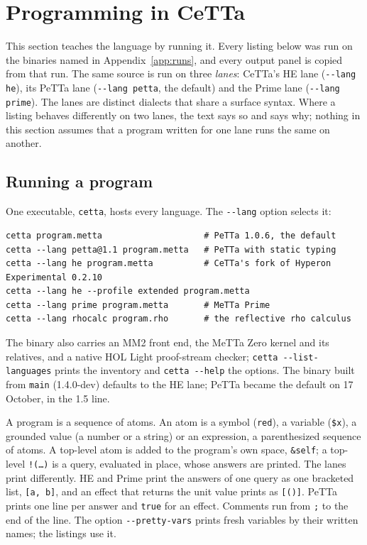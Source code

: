 \documentclass[11pt]{article}
\newcommand{\code}[1]{\texttt{#1}}
\newcommand{\PeTTa}{\textup{PeTTa}}
\newcommand{\HE}{\textup{HE}}
\newcommand{\CeTTa}{\textup{CeTTa}}
\begin{document}
\section{Programming in \CeTTa{}}
\label{sec:tutorial}

This section teaches the language by running it.  Every listing below was run
on the binaries named in Appendix~\ref{app:runs}, and every output panel is
copied from that run.  The same source is run on three \emph{lanes}: \CeTTa{}'s
\HE{} lane (\code{-{}-lang he}), its \PeTTa{} lane (\code{-{}-lang petta}, the
default) and the Prime lane (\code{-{}-lang prime}).  The lanes are distinct
dialects that share a surface syntax.  Where a listing behaves differently on
two lanes, the text says so and says why; nothing in this section assumes that
a program written for one lane runs the same on another.

\subsection{Running a program}
\label{sec:tut-running}

One executable, \code{cetta}, hosts every language.  The \code{-{}-lang} option
selects it:

\begin{lstlisting}[style=metta]
cetta program.metta                    # PeTTa 1.0.6, the default
cetta --lang petta@1.1 program.metta   # PeTTa with static typing
cetta --lang he program.metta          # CeTTa's fork of Hyperon Experimental 0.2.10
cetta --lang he --profile extended program.metta
cetta --lang prime program.metta       # MeTTa Prime
cetta --lang rhocalc program.rho       # the reflective rho calculus
\end{lstlisting}

\noindent
The binary also carries an MM2 front end, the MeTTa Zero kernel and its
relatives, and a native HOL Light proof-stream checker; \code{cetta
-{}-list-languages} prints the inventory and \code{cetta -{}-help} the options.
The binary built from \code{main} (1.4.0-dev) defaults to the \HE{} lane;
\PeTTa{} became the default on 17 October, in the 1.5 line.

A program is a sequence of atoms.  An atom is a symbol (\code{red}), a
variable (\code{\$x}), a grounded value (a number or a string) or an
expression, a parenthesized sequence of atoms.  A top-level atom is added to
the program's own space, \code{\&self}; a top-level \code{!(\ldots)} is a
query, evaluated in place, whose answers are printed.  The lanes print
differently.  \HE{} and Prime print the answers of one query as one bracketed
list, \code{[a, b]}, and an effect that returns the unit value prints as
\code{[()]}.  \PeTTa{} prints one line per answer and \code{true} for an
effect.  Comments run from \code{;} to the end of the line.  The option
\code{-{}-pretty-vars} prints fresh variables by their written names; the
listings use it.
\end{document}
